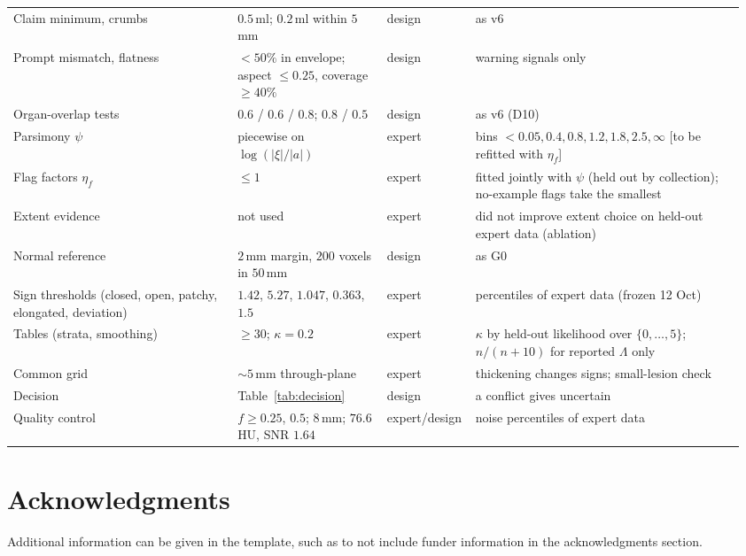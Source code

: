 \documentclass[fleqn,10pt]{olplainarticle}
\begin{document}
\begin{table}[t]
\begin{tabular}{p{0.30\linewidth}p{0.20\linewidth}p{0.10\linewidth}p{0.36\linewidth}}
Claim minimum, crumbs & $0.5$\,ml; $0.2$\,ml within $5$\,mm & design & as v6\\
Prompt mismatch, flatness & $<50\%$ in envelope; aspect $\le0.25$, coverage $\ge40\%$ & design & warning signals only\\
Organ-overlap tests & $0.6$ / $0.6$ / $0.8$; $0.8$ / $0.5$ & design & as v6 (D10)\\
Parsimony $\psi$ & piecewise on $\log(|\xi|/|a|)$ & expert & bins $<0.05,0.4,0.8,1.2,1.8,2.5,\infty$ [to be refitted with $\eta_f$]\\
Flag factors $\eta_f$ & $\le1$ & expert & fitted jointly with $\psi$ (held out by collection); no-example flags take the smallest\\
Extent evidence & not used & expert & did not improve extent choice on held-out expert data (ablation)\\
Normal reference & $2$\,mm margin, $200$ voxels in $50$\,mm & design & as G0\\
Sign thresholds (closed, open, patchy, elongated, deviation) & $1.42$, $5.27$, $1.047$, $0.363$, $1.5$ & expert & percentiles of expert data (frozen 12 Oct)\\
Tables (strata, smoothing) & $\ge30$; $\kappa=0.2$ & expert & $\kappa$ by held-out likelihood over $\{0,\dots,5\}$; $n/(n+10)$ for reported $\Lambda$ only\\
Common grid & $\sim5$\,mm through-plane & expert & thickening changes signs; small-lesion check\\
Decision & Table~\ref{tab:decision} & design & a conflict gives uncertain\\
Quality control & $f\ge0.25$, $0.5$; $8$\,mm; $76.6$\,HU, SNR $1.64$ & expert/design & noise percentiles of expert data\\
\hline
\end{tabular}
\end{table}

\section*{Acknowledgments}

Additional information can be given in the template, such as to not include funder information in the acknowledgments section.


\end{document}
